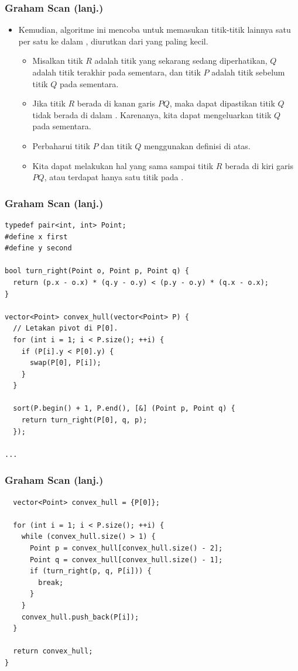 \begin{frame}
\frametitle{Graham Scan (lanj.)}
\begin{itemize}
  \item Kemudian, algoritme ini mencoba untuk memasukan titik-titik lainnya satu per satu ke dalam \fconvexHull, diurutkan dari yang paling kecil.
  \begin{itemize}
    \item Misalkan titik $R$ adalah titik yang sekarang sedang diperhatikan, $Q$ adalah titik terakhir pada \fconvexHull sementara, dan titik $P$ adalah titik sebelum titik $Q$ pada \fconvexHull sementara.
    \item Jika titik $R$ berada di kanan garis $PQ$, maka dapat dipastikan titik $Q$ tidak berada di dalam \fconvexHull. Karenanya, kita dapat mengeluarkan titik $Q$ pada \fconvexHull sementara.
    \item Perbaharui titik $P$ dan titik $Q$ menggunakan definisi di atas.
    \item Kita dapat melakukan hal yang sama sampai titik $R$ berada di kiri garis $PQ$, atau terdapat hanya satu titik pada \fconvexHull.
  \end{itemize}
\end{itemize}
\end{frame}

\begin{frame}[fragile]
\frametitle{Graham Scan (lanj.)}
\begin{lstlisting}
typedef pair<int, int> Point;
#define x first
#define y second

bool turn_right(Point o, Point p, Point q) {
  return (p.x - o.x) * (q.y - o.y) < (p.y - o.y) * (q.x - o.x);
}

vector<Point> convex_hull(vector<Point> P) {
  // Letakan pivot di P[0].
  for (int i = 1; i < P.size(); ++i) {
    if (P[i].y < P[0].y) {
      swap(P[0], P[i]);
    }
  }

  sort(P.begin() + 1, P.end(), [&] (Point p, Point q) {
    return turn_right(P[0], q, p);
  });

...
\end{lstlisting}
\end{frame}

\begin{frame}[fragile]
\frametitle{Graham Scan (lanj.)}
\begin{lstlisting}
  vector<Point> convex_hull = {P[0]};

  for (int i = 1; i < P.size(); ++i) {
    while (convex_hull.size() > 1) {
      Point p = convex_hull[convex_hull.size() - 2];
      Point q = convex_hull[convex_hull.size() - 1];
      if (turn_right(p, q, P[i])) {
        break;
      }
    }
    convex_hull.push_back(P[i]);
  }

  return convex_hull;
}
\end{lstlisting}
\end{frame}

